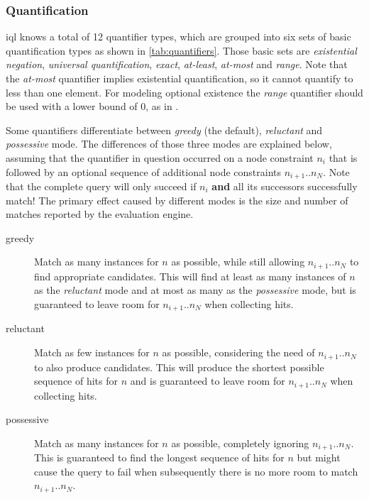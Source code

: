 \documentclass[11pt,a4paper]{report}
\begin{document}
\subsubsection{Quantification}
\label{sec:quantification}
\ac{iql} knows a total of 12 quantifier types, which are grouped into six sets of basic quantification types as shown in \cref{tab:quantifiers}.
Those basic sets are \textit{existential negation}, \textit{universal quantification}, \textit{exact}, \textit{at-least}, \textit{at-most} and \textit{range}.
Note that the \textit{at-most} quantifier implies existential quantification, so it cannot quantify to less than one element. 
For modeling optional existence the \textit{range} quantifier should be used with a lower bound of 0, as in .

Some quantifiers differentiate between \textit{greedy} (the default), \textit{reluctant} and \textit{possessive} mode.
The differences of those three modes are explained below, assuming that the quantifier in question occurred on a node constraint $n_i$ that is followed by an optional sequence of additional node constraints $n_{i+1}..n_N$.
Note that the complete query will only succeed if $n_i$ \textbf{and} all its successors successfully match!
The primary effect caused by different modes is the size and number of matches reported by the evaluation engine.
\begin{description}
	\item[greedy] Match as many instances for $n$ as possible, while still allowing $n_{i+1}..n_N$ to find appropriate candidates. This will find at least as many instances of $n$ as the \textit{reluctant} mode and at most as many as the \textit{possessive} mode, but is guaranteed to leave room for $n_{i+1}..n_N$ when collecting hits.
	\item[reluctant] Match as few instances for $n$ as possible, considering the need of $n_{i+1}..n_N$ to also produce candidates. This will produce the shortest possible sequence of hits for $n$ and is guaranteed to leave room for $n_{i+1}..n_N$ when collecting hits.
	\item[possessive] Match as many instances for $n$ as possible, completely ignoring $n_{i+1}..n_N$. This is guaranteed to find the longest sequence of hits for $n$ but might cause the query to fail when subsequently there is no more room to match $n_{i+1}..n_N$.
\end{description}
\end{document}
